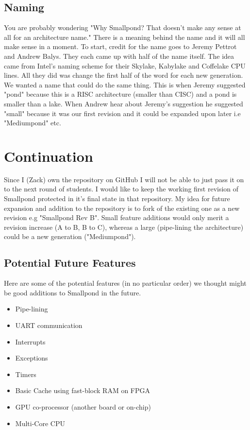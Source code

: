 \documentclass[12pt]{article}
\begin{document}
    \subsection{Naming}
    You are probably wondering "Why Smallpond? That doesn't make any sense at all for an architecture name." There is a meaning behind the name and it will all make sense in a moment. To start, credit for the name goes to Jeremy Pettrot and Andrew Balys. They each came up with half of the name itself. The idea came from Intel's naming scheme for their Skylake, Kabylake and Coffelake CPU lines. All they did was change the first half of the word for each new generation. We wanted a name that could do the same thing. This is when Jeremy suggested "pond" because this is a RISC architecture (smaller than CISC) and a pond is smaller than a lake. When Andrew hear about Jeremy's suggestion he suggested "small" because it was our first revision and it could be expanded upon later i.e "Mediumpond" etc.
\newpage

\section{Continuation}
Since I (Zack) own the repository on GitHub I will not be able to just pass it on to the next round of students. I would like to keep the working first revision of Smallpond protected in it's final state in that repository. My idea for future expansion and addition to the repository is to fork of the existing one as a new revision e.g "Smallpond Rev B". Small feature additions would only merit a revision increase (A to B, B to C), whereas a large (pipe-lining the architecture) could be a new generation ("Mediumpond").

    \subsection{Potential Future Features}
    Here are some of the potential features (in no particular order) we thought might be good additions to Smallpond in the future.\\
    \begin{itemize}
        \item Pipe-lining
        \item UART communication
        \item Interrupts
        \item Exceptions
        \item Timers
        \item Basic Cache using fast-block RAM on FPGA
        \item GPU co-processor (another board or on-chip)
        \item Multi-Core CPU
    \end{itemize}
    
\end{document}
